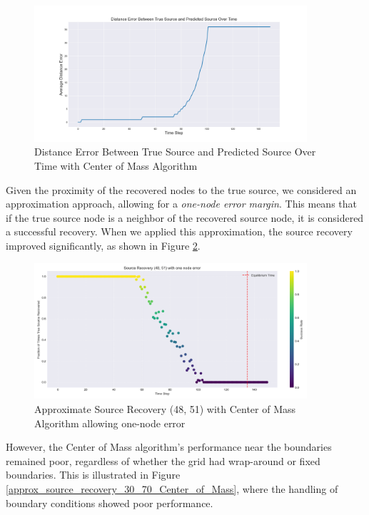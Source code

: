 \begin{figure}[H]
\centering
\includegraphics[width=0.9\textwidth]{Distance_Error_True_Predicted_Source_Center_Mass.png}
\caption{Distance Error Between True Source and Predicted Source Over Time with Center of Mass Algorithm}
\label{Distance_Error_True_Predicted_Source_Center_Mass}
\end{figure}

Given the proximity of the recovered nodes to the true source, we considered an approximation approach, allowing for a \textit{one-node error margin}. This means that if the true source node is a neighbor of the recovered source node, it is considered a successful recovery. When we applied this approximation, the source recovery improved significantly, as shown in Figure \ref{approx_source_recovery_48_51_Center_of_Mass}.

\begin{figure}[H]
\centering
\includegraphics[width=0.9\textwidth]{approx_source_recovery_48_51_Center_of_Mass.png}
\caption{Approximate Source Recovery (48, 51) with Center of Mass Algorithm allowing one-node error}
\label{approx_source_recovery_48_51_Center_of_Mass}
\end{figure}

However, the Center of Mass algorithm's performance near the boundaries remained poor, regardless of whether the grid had wrap-around or fixed boundaries. This is illustrated in Figure \ref{approx_source_recovery_30_70_Center_of_Mass}, where the handling of boundary conditions showed poor performance.

